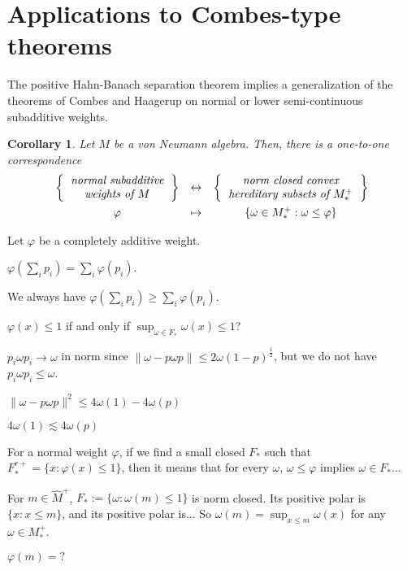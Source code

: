 \documentclass[noamsfonts,a4paper,10pt]{amsart}
\theoremstyle{plain}
\newtheorem{cor}[thm]{Corollary}
\theoremstyle{definition}
\theoremstyle{remark}
\begin{document}
\iffalse
\section{Applications to Combes-type theorems}


The positive Hahn-Banach separation theorem implies a generalization of the theorems of Combes and Haagerup on normal or lower semi-continuous subadditive weights.
\begin{cor}
Let $M$ be a von Neumann algebra.
Then, there is a one-to-one correspondence
\[\begin{array}{ccc}
\left\{\emph{\begin{tabular}{c}normal subadditive\\weights of $M$\end{tabular}}\right\}&\leftrightarrow&\left\{\emph{\begin{tabular}{c}norm closed convex\\hereditary subsets of $M_*^+$\end{tabular}}\right\}\\[10pt]
\varphi&\mapsto&\{\omega\in M_*^+:\omega\le\varphi\}
\end{array}\]
\end{cor}


Let $\varphi$ be a completely additive weight.

$\varphi(\sum_ip_i)=\sum_i\varphi(p_i)$.

We always have $\varphi(\sum_ip_i)\ge\sum_i\varphi(p_i)$.


$\varphi(x)\le1$ if and only if $\sup_{\omega\in F_*}\omega(x)\le1$?




$p_i\omega p_i\to\omega$ in norm since $\|\omega-p\omega p\|\le2\omega(1-p)^{\frac12}$, but we do not have $p_i\omega p_i\le\omega$.

$\|\omega-p\omega p\|^2\le4\omega(1)-4\omega(p)$

$4\omega(1)\lesssim 4\omega(p)$


For a normal weight $\varphi$, if we find a small closed $F_*$ such that $F_*^{r+}=\{x:\varphi(x)\le1\}$, then it means that for every $\omega$, $\omega\le\varphi$ implies $\omega\in F_*$...


For $m\in\widehat M^+$, $F_*:=\{\omega:\omega(m)\le1\}$ is norm closed.
Its positive polar is $\{x:x\le m\}$, and its positive polar is...
So $\omega(m)=\sup_{x\le m}\omega(x)$ for any $\omega\in M_*^+$.


$\varphi(m)=?$
\end{document}
